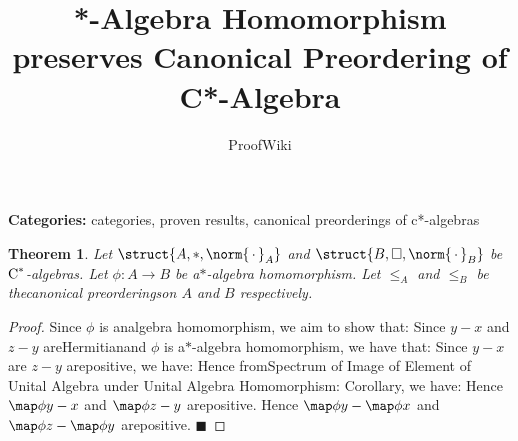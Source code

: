 \documentclass{article}
\title{*-Algebra Homomorphism preserves Canonical Preordering of C*-Algebra}
\author{ProofWiki}
\date{}
\newtheorem{theorem}{Theorem}
\begin{document}
\maketitle

\noindent\textbf{Categories:} categories, proven results, canonical preorderings of c*-algebras

\begin{theorem}
Let $\struct {A, \ast, \norm {\, \cdot \,}_A}$ and $\struct {B, \square, \norm {\, \cdot \,}_B}$ be$\text C^\ast$-algebras. Let $\phi : A \to B$ be a$\ast$-algebra homomorphism. Let $\le_A$ and $\le_B$ be thecanonical preorderingson $A$ and $B$ respectively.
\end{theorem}

\begin{proof}
Since $\phi$ is analgebra homomorphism, we aim to show that: Since $y - x$ and $z - y$ areHermitianand $\phi$ is a$\ast$-algebra homomorphism, we have that: Since $y - x$ are $z - y$ arepositive, we have: Hence fromSpectrum of Image of Element of Unital Algebra under Unital Algebra Homomorphism: Corollary, we have: Hence $\map \phi {y - x}$ and $\map \phi {z - y}$ arepositive. Hence $\map \phi y - \map \phi x$ and $\map \phi z - \map \phi y$ arepositive. $\blacksquare$
\end{proof}
\end{document}
